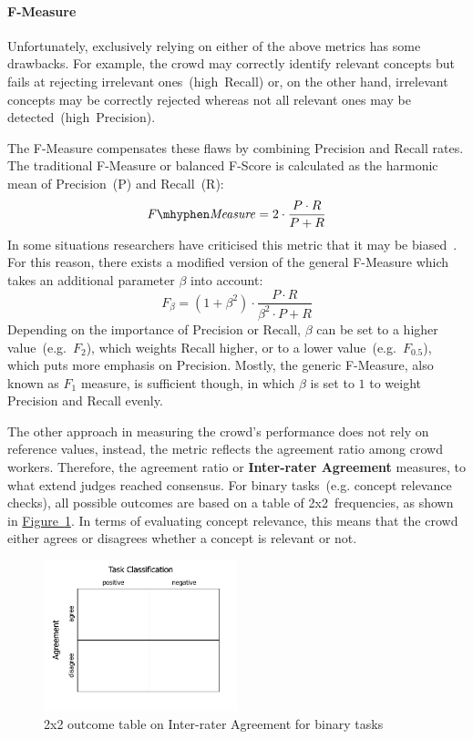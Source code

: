 \documentclass[draft,final]{vutinfth} %
\begin{document}
\paragraph{F-Measure} Unfortunately, exclusively relying on either of the above metrics has some drawbacks. For example, the crowd may correctly identify relevant concepts but fails at rejecting irrelevant ones~(high~Recall) or, on the other hand, irrelevant concepts may be correctly rejected whereas not all relevant ones may be detected~(high~Precision). 

The F-Measure compensates these flaws by combining Precision and Recall rates. The traditional F-Measure or balanced F-Score is calculated as the harmonic mean of Precision~(P) and Recall~(R):
\[ \mathit{F \mhyphen Measure} = 2 \cdot \frac{P \cdot R}{P + R} \]
In some situations researchers have criticised this metric that it may be biased~\cite{powers2011}. For this reason, there exists a modified version of the general F-Measure which takes an additional parameter $\beta$ into account:
\[ F_\beta = (1 + \beta^2) \cdot \frac{P \cdot R}{\beta^2 \cdot P + R} \]
Depending on the importance of Precision or Recall, $\beta$ can be set to a higher value~(e.g.~$F_2$), which weights Recall higher, or to a lower value~(e.g.~$F_{0.5}$), which puts more emphasis on Precision. Mostly, the generic F-Measure, also known as $F_1$ measure, is sufficient though, in which $\beta$ is set to $1$ to weight Precision and Recall evenly. 

The other approach in measuring the crowd's performance does not rely on reference values, instead, the metric reflects the agreement ratio among crowd workers. Therefore, the agreement ratio or \textbf{Inter-rater Agreement} measures, to what extend judges reached consensus. For binary tasks~(e.g. concept relevance checks), all possible outcomes are based on a table of 2x2~frequencies, as shown in \hyperref[fig:2x2_inter_rater_table]{Figure~\ref*{fig:2x2_inter_rater_table}}. In terms of evaluating concept relevance, this means that the crowd either agrees or disagrees whether a concept is relevant or not. 
\begin{figure}
	 \centering
	 \includegraphics[width=0.5\textwidth]{drawio/Inter_Rater_Outcome_Table}
	 \caption{2x2 outcome table on Inter-rater Agreement for binary tasks}\label{fig:2x2_inter_rater_table}
\end{figure}
\end{document}
